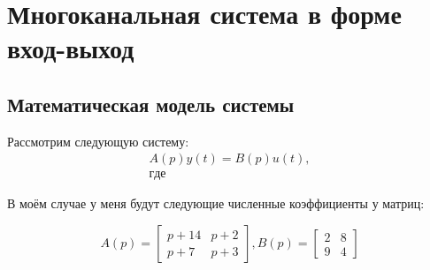 \chapter{Многоканальная система в форме вход-выход}
\label{ch:chap3}
\section{Математическая модель системы}


  
  


Рассмотрим следующую систему:
$$
\begin{aligned}
A(p)y(t) = B(p)u(t), \\ где
\end{aligned}
$$

В моём случае у меня будут следующие численные коэффициенты у матриц:

$$
A(p) = \begin{bmatrix}
        p+14 & p+2  \\
        p+7 & p+3 
        \end{bmatrix} , 
B(p) = \begin{bmatrix}
        2 & 8  \\
        9 & 4 
        \end{bmatrix}
$$

